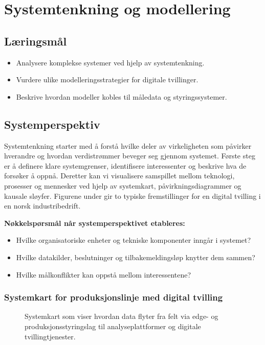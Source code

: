 \chapter{Systemtenkning og modellering}


\section{Læringsmål}
\begin{itemize}
    \item Analysere komplekse systemer ved hjelp av systemtenkning.
    \item Vurdere ulike modelleringsstrategier for digitale tvillinger.
    \item Beskrive hvordan modeller kobles til måledata og styringssystemer.
\end{itemize}

\section{Systemperspektiv}
Systemtenkning starter med å forstå hvilke deler av virkeligheten som påvirker hverandre og hvordan verdistrømmer beveger seg gjennom systemet. Første steg er å definere klare systemgrenser, identifisere interessenter og beskrive hva de forsøker å oppnå. Deretter kan vi visualisere samspillet mellom teknologi, prosesser og mennesker ved hjelp av systemkart, påvirkningsdiagrammer og kausale sløyfer. Figurene under gir to typiske fremstillinger for en digital tvilling i en norsk industribedrift.

\textbf{Nøkkelspørsmål når systemperspektivet etableres:}
\begin{itemize}
    \item Hvilke organisatoriske enheter og tekniske komponenter inngår i systemet?
    \item Hvilke datakilder, beslutninger og tilbakemeldingsløp knytter dem sammen?
    \item Hvilke målkonflikter kan oppstå mellom interessentene?
\end{itemize}

\subsection{Systemkart for produksjonslinje med digital tvilling}
\begin{figure}[ht]
    \centering
    \resizebox{\textwidth}{!}{}
    \caption{Systemkart som viser hvordan data flyter fra felt via edge- og produksjonsstyringslag til analyseplattformer og digitale tvillingtjenester.}
    \label{fig:kap02-systemkart}
\end{figure}

